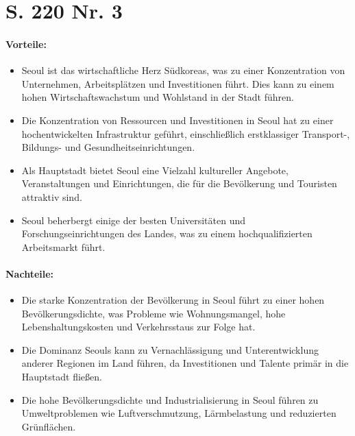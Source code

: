 \documentclass[12pt,a4paper]{report}
\begin{document}
	
	\section{S. 220 Nr. 3}
	\paragraph{Vorteile:}
	\begin{itemize}
		\item	Seoul ist das wirtschaftliche Herz Südkoreas, was zu einer Konzentration von Unternehmen, Arbeitsplätzen und Investitionen führt. Dies kann zu einem hohen Wirtschaftswachstum und Wohlstand in der Stadt führen.
		\item Die Konzentration von Ressourcen und Investitionen in Seoul hat zu einer hochentwickelten Infrastruktur geführt, einschließlich erstklassiger Transport-, Bildungs- und Gesundheitseinrichtungen.
		\item Als Hauptstadt bietet Seoul eine Vielzahl kultureller Angebote, Veranstaltungen und Einrichtungen, die für die Bevölkerung und Touristen attraktiv sind.
		\item Seoul beherbergt einige der besten Universitäten und Forschungseinrichtungen des Landes, was zu einem hochqualifizierten Arbeitsmarkt führt.
	\end{itemize}
	\paragraph{Nachteile:}
	\begin{itemize}
		\item Die starke Konzentration der Bevölkerung in Seoul führt zu einer hohen Bevölkerungsdichte, was Probleme wie Wohnungsmangel, hohe Lebenshaltungskosten und Verkehrsstaus zur Folge hat.
		\item Die Dominanz Seouls kann zu Vernachlässigung und Unterentwicklung anderer Regionen im Land führen, da Investitionen und Talente primär in die Hauptstadt fließen.
		\item Die hohe Bevölkerungsdichte und Industrialisierung in Seoul führen zu Umweltproblemen wie Luftverschmutzung, Lärmbelastung und reduzierten Grünflächen.
	\end{itemize}
	
\end{document}
